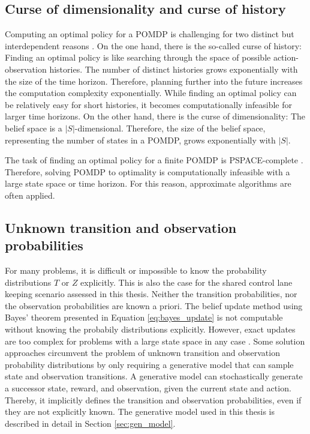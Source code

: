 \subsection{Curse of dimensionality and curse of history}

Computing an optimal policy for a POMDP is challenging for two distinct but interdependent reasons \parencite{pomdp_curses}. On the one hand, there is the so-called curse of history: Finding an optimal policy is like searching through the space of possible action-observation histories. The number of distinct histories grows exponentially with the size of the time horizon. Therefore, planning further into the future increases the computation complexity exponentially. While finding an optimal policy can be relatively easy for short histories, it becomes computationally infeasible for larger time horizons. On the other hand, there is the curse of dimensionality: The belief space is a $|S|$-dimensional. Therefore, the size of the belief space, representing the number of states in a POMDP, grows exponentially with $|S|$.

The task of finding an optimal policy for a finite POMDP is PSPACE-complete \parencite{pomdp_complex}. Therefore, solving POMDP to optimality is computationally infeasible with a large state space or time horizon. For this reason, approximate algorithms are often applied. 

\subsection{Unknown transition and observation probabilities}

For many problems, it is difficult or impossible to know the probability distributions $T$ or $Z$ explicitly. This is also the case for the shared control lane keeping scenario assessed in this thesis. Neither the transition probabilities, nor the observation probabilities are known a priori. The belief update method using Bayes' theorem presented in Equation \ref{eq:bayes_update} is not computable without knowing the probabily distributions explicitly. However, exact updates are too complex for problems with a large state space in any case \parencite{pomcp}. Some solution approaches circumvent the problem of unknown transition and observation probability distributions by only requiring a generative model that can sample state and observation transitions. A generative model can stochastically generate a successor state, reward, and observation, given the current state and action. Thereby, it implicitly defines the transition and observation probabilities, even if they are not explicitly known. The generative model used in this thesis is described in detail in Section \ref{sec:gen_model}.

